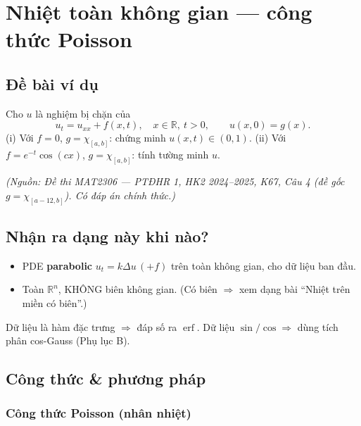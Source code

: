 
\section{Nhiệt toàn không gian --- công thức Poisson}

\subsection*{Đề bài ví dụ}
Cho $u$ là nghiệm bị chặn của
\[
  u_t=u_{xx}+f(x,t),\quad x\in\mathbb{R},\ t>0,\qquad u(x,0)=g(x).
\]
(i) Với $f=0$, $g=\chi_{[a,b]}$: chứng minh $u(x,t)\in(0,1)$. \quad
(ii) Với $f=e^{-t}\cos(cx)$, $g=\chi_{[a,b]}$: tính tường minh $u$.

\emph{\small(Nguồn: Đề thi MAT2306 --- PTĐHR 1, HK2 2024--2025, K67, Câu 4 (đề gốc $g=\chi_{[a-12,b]}$). Có đáp án chính thức.)}

\subsection*{Nhận ra dạng này khi nào?}
\begin{itemize}
  \item PDE \textbf{parabolic} $u_t=k\Delta u\,(+f)$ trên toàn không gian, cho dữ liệu ban đầu.
  \item Toàn $\mathbb{R}^n$, KHÔNG biên không gian. (Có biên $\Rightarrow$ xem dạng bài ``Nhiệt trên miền có biên''.)
\end{itemize}
\begin{meobox}
Dữ liệu là hàm đặc trưng $\Rightarrow$ đáp số ra $\operatorname{erf}$. Dữ liệu $\sin/\cos\Rightarrow$ dùng tích phân cos-Gauss (Phụ lục B).
\end{meobox}

\subsection*{Công thức \& phương pháp}
\subsubsection*{Công thức Poisson (nhân nhiệt)}


